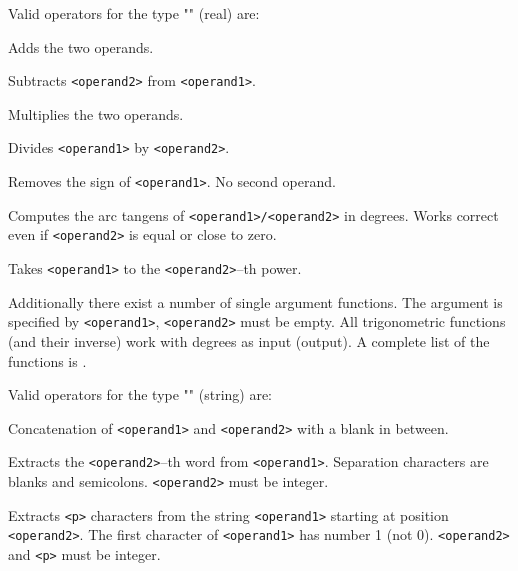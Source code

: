 \noindent
Valid operators for the type "" (real) are:
\begin{deflist}{}
\item[\exm{+}]
   Adds the two operands.
\item[\exm{-}]
   Subtracts \verb+<operand2>+ from \verb+<operand1>+.
\item[\exm{*}]
   Multiplies the two operands.
\item[\exm{div}]
   Divides \verb+<operand1>+ by \verb+<operand2>+.
\item[\exm{abs}]
   Removes the sign of \verb'<operand1>'.  No second operand.
\item[\exm{arctan2}]
   Computes the arc tangens of \verb'<operand1>/<operand2>' in
   degrees.  Works correct even if \verb'<operand2>' is equal or
   close to zero.
\item[\exm{power}]
   Takes \verb'<operand1>' to the \verb'<operand2>'--th power.
\end{deflist}
Additionally there exist a number of single argument functions.
The argument is specified by \verb'<operand1>', \verb'<operand2>'
must be empty.  All trigonometric functions (and their inverse)
work with degrees as input (output).  A complete list of the
functions is .
\bigskip

\noindent
Valid operators for the type "" (string) are:
\begin{deflist}{}
\item[\exm{+}]
   Concatenation of \verb'<operand1>' and \verb'<operand2>'
   with a blank in between.
\item[\exm{parse}]
   Extracts the \verb'<operand2>'--th word from \verb'<operand1>'.
   Separation characters are blanks and semicolons.
   \verb'<operand2>' must be integer.
\item[\exm{extract}]
   Extracts \verb'<p>' characters from the string \verb'<operand1>'
   starting at position \verb'<operand2>'.  The first character
   of \verb'<operand1>' has number 1 (not 0).  \verb'<operand2>' and
   \verb'<p>' must be integer.
\end{deflist}
\bigskip

